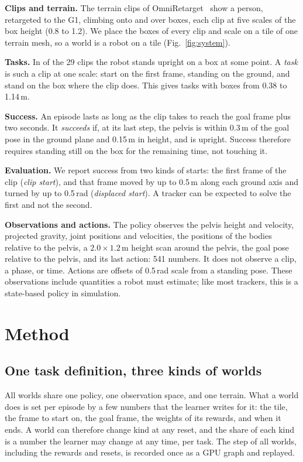\textbf{Clips and terrain.} The terrain clips of OmniRetarget~\cite{omniretarget} show a person, retargeted to the G1, climbing onto and over boxes, each clip at five scales of the box height (0.8 to 1.2). We place the boxes of every clip and scale on a tile of one terrain mesh, so a world is a robot on a tile (Fig.~\ref{fig:system}).

\textbf{Tasks.} In \clipsall{} of the 29 clips the robot stands upright on a box at some point. A \emph{task} is such a clip at one scale: start on the first frame, standing on the ground, and stand on the box where the clip does. This gives \tasksall{} tasks with boxes from 0.38 to 1.14\,m.

\textbf{Success.} An episode lasts as long as the clip takes to reach the goal frame plus two seconds. It \emph{succeeds} if, at its last step, the pelvis is within 0.3\,m of the goal pose in the ground plane and 0.15\,m in height, and is upright. Success therefore requires standing still on the box for the remaining time, not touching it.

\textbf{Evaluation.} We report success from two kinds of starts: the first frame of the clip (\emph{clip start}), and that frame moved by up to 0.5\,m along each ground axis and turned by up to 0.5\,rad (\emph{displaced start}). A tracker can be expected to solve the first and not the second.

\textbf{Observations and actions.} The policy observes the pelvis height and velocity, projected gravity, joint positions and velocities, the positions of the bodies relative to the pelvis, a $2.0\times1.2$\,m height scan around the pelvis, the goal pose relative to the pelvis, and its last action: 541 numbers. It does not observe a clip, a phase, or time. Actions are offsets of 0.5\,rad scale from a standing pose. These observations include quantities a robot must estimate; like most trackers, this is a state-based policy in simulation.

\section{Method}
\label{sec:method}

\subsection{One task definition, three kinds of worlds}

All worlds share one policy, one observation space, and one terrain. What a world does is set per episode by a few numbers that the learner writes for it: the tile, the frame to start on, the goal frame, the weights of its rewards, and when it ends. A world can therefore change kind at any reset, and the share of each kind is a number the learner may change at any time, per task. The step of all worlds, including the rewards and resets, is recorded once as a GPU graph and replayed.

